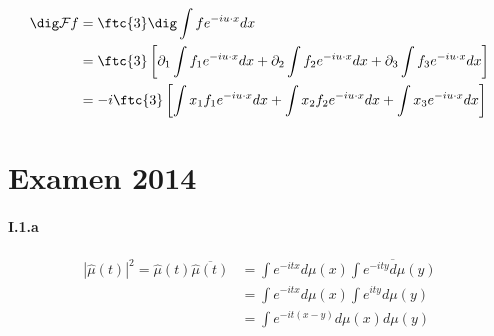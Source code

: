 \begin{align}
    \dig \mathcal{F}f &= \ftc{3} \dig \int f e^{-iu \cdot x} dx \\
    &= \ftc{3} \left [
        \partial_1 \int f_1 e^{-iu \cdot x} dx
        + \partial_2 \int f_2 e^{-iu \cdot x} dx
        + \partial_3 \int f_3 e^{-iu \cdot x} dx
    \right] \\
%
    &= -i \ftc{3} \left [
        \int x_1 f_1 e^{-iu \cdot x} dx
        + \int x_2 f_2 e^{-iu \cdot x} dx
        + \int x_3 e^{-iu \cdot x} dx
        \right] \\
\end{align}



\section{Examen 2014}

\paragraph{I.1.a}

\begin{align}
    |\hat{\mu}(t)|^2 = \hat{\mu}(t) \overline{\hat{\mu}(t)}
    &= \int e^{-itx} d\mu(x) \overline{\int e^{-ity} d\mu(y)} \\
    &= \int e^{-itx} d\mu(x) \int e^{ity} d\mu(y) \\
    &= \int e^{-it(x-y)} d\mu(x) d\mu(y) \\
\end{align}

